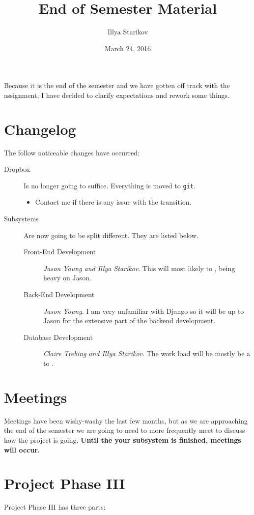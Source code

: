 \documentclass{scrartcl}
\title{End of Semester Material}
\author{Illya Starikov}
\date{March 24, 2016}
\newcommand{\shellcmd}[1]{\texttt{\colorbox{gray!30}{#1}}}
\begin{document}
\maketitle

Because it is the end of the semester and we have gotten off track with the assignment, I have decided to clarify expectations and rework some things.

\section{Changelog}
The follow noticeable changes have occurred:
\begin{description}
    \item [Dropbox] Is no longer going to suffice. Everything is moved to \shellcmd{git}.
    \begin{itemize}
        \item Contact me if there is any issue with the transition.
    \end{itemize}
    \item [Subsystems] Are now going to be split different. They are listed below.
    \begin{description}
        \item[Front-End Development] \textit{Jason Young and Illya Starikov}. This will most likely  to , being heavy on Jason.
        \item[Back-End Development] \textit{Jason Young.} I am very unfamiliar with Django so it will be up to Jason for the extensive part of the backend development.
        \item[Database Development] \textit{Claire Trebing and Illya Starikov}. The work load will be mostly be a  to .
    \end{description}
\end{description}

\section{Meetings}
Meetings have been wishy-washy the last few months, but as we are approaching the end of the semester we are going to need to more frequently meet to discuss how the project is going. \textbf{Until the your subsystem is finished, meetings will occur.}

\section{Project Phase III}
Project Phase III has three parts:
\end{document}
